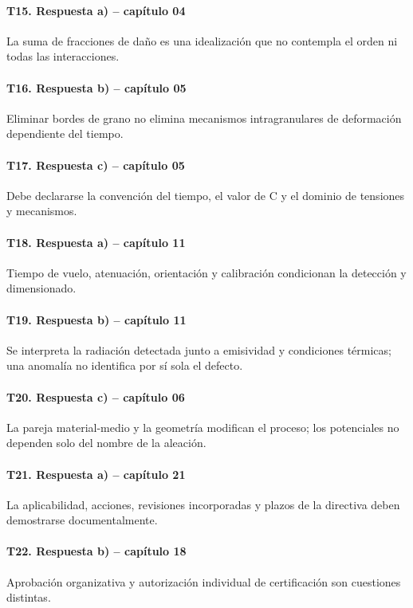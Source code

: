 \paragraph{T15. Respuesta a) -- capítulo 04} La suma de fracciones de daño es una idealización que no contempla el orden ni todas las interacciones.

\paragraph{T16. Respuesta b) -- capítulo 05} Eliminar bordes de grano no elimina mecanismos intragranulares de deformación dependiente del tiempo.

\paragraph{T17. Respuesta c) -- capítulo 05} Debe declararse la convención del tiempo, el valor de C y el dominio de tensiones y mecanismos.

\paragraph{T18. Respuesta a) -- capítulo 11} Tiempo de vuelo, atenuación, orientación y calibración condicionan la detección y dimensionado.

\paragraph{T19. Respuesta b) -- capítulo 11} Se interpreta la radiación detectada junto a emisividad y condiciones térmicas; una anomalía no identifica por sí sola el defecto.

\paragraph{T20. Respuesta c) -- capítulo 06} La pareja material-medio y la geometría modifican el proceso; los potenciales no dependen solo del nombre de la aleación.

\paragraph{T21. Respuesta a) -- capítulo 21} La aplicabilidad, acciones, revisiones incorporadas y plazos de la directiva deben demostrarse documentalmente.

\paragraph{T22. Respuesta b) -- capítulo 18} Aprobación organizativa y autorización individual de certificación son cuestiones distintas.

